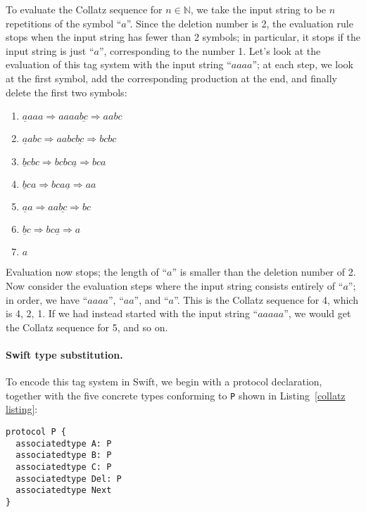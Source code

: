 \documentclass[../generics]{subfiles}
\begin{document}
To evaluate the Collatz sequence for $n\in\mathbb{N}$, we take the input string to be $n$ repetitions of the symbol ``$a$''. Since the deletion number is 2, the evaluation rule stops when the input string has fewer than 2 symbols; in particular, it stops if the input string is just ``$a$'', corresponding to the number 1. Let's look at the evaluation of this tag system with the input string ``$aaaa$''; at each step, we look at the first symbol, add the corresponding production at the end, and finally delete the first two symbols:
\begin{enumerate}
\item $\underline{a}aaa \Rightarrow aaaa\underline{bc} \Rightarrow aabc$
\item $\underline{a}abc \Rightarrow aabc\underline{bc} \Rightarrow bcbc$
\item $\underline{b}cbc \Rightarrow bcbc\underline{a} \Rightarrow bca$
\item $\underline{b}ca \Rightarrow bca\underline{a} \Rightarrow aa$
\item $\underline{a}a \Rightarrow aa\underline{bc} \Rightarrow bc$
\item $\underline{b}c \Rightarrow bc\underline{a} \Rightarrow a$
\item $a$
\end{enumerate}
Evaluation now stops; the length of ``$a$'' is smaller than the deletion number of 2. Now consider the evaluation steps where the input string consists entirely of ``$a$''; in order, we have ``$aaaa$'', ``$aa$'', and ``$a$''. This is the Collatz sequence for 4, which is 4, 2, 1. If we had instead started with the input string ``$aaaaa$'', we would get the Collatz sequence for 5, and so on.

\paragraph{Swift type substitution.}
To encode this tag system in Swift, we begin with a protocol declaration, together with the five concrete types conforming to \texttt{P} shown in Listing~\ref{collatz listing}:
\begin{Verbatim}
protocol P {
  associatedtype A: P
  associatedtype B: P
  associatedtype C: P
  associatedtype Del: P
  associatedtype Next
}
\end{Verbatim}
\end{document}
